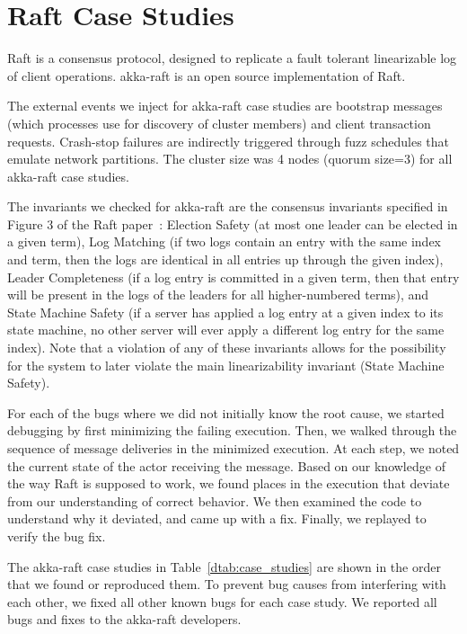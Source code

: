 \section{Raft Case Studies}
\label{app:raft_case_studies}

Raft is a consensus protocol, designed to replicate a fault tolerant linearizable log of
client operations. akka-raft is an open source implementation of Raft.

The external events we inject for akka-raft case studies are
bootstrap messages (which
processes use for discovery of cluster members)
and client transaction requests. Crash-stop failures are indirectly triggered through
fuzz schedules that emulate network partitions.
The cluster size was 4 nodes
(quorum size=3) for all akka-raft case studies.

The invariants we checked for akka-raft are the consensus invariants specified in
Figure 3 of the Raft paper~\cite{ongaro2014search}: Election Safety
(at most one leader can be elected in a
given term), Log Matching (if two logs contain an entry with the same
index and term, then the logs are identical in all entries
up through the given index), Leader Completeness (if a log entry is
committed in a
given term, then that entry will be present in the logs
of the leaders for all higher-numbered terms), and State Machine Safety
(if a server has applied a log entry
at a given index to its state machine, no other server
will ever apply a different log entry for the same index). Note that a
violation of any of these invariants allows for the possibility for the system
to later violate
the main linearizability invariant (State Machine Safety).

For each of the bugs where we did not initially know the root cause, we
started debugging by first minimizing the failing execution. Then,
we walked through the sequence of message deliveries in the
minimized execution. At each step,
we noted the current state of the actor receiving the message. Based on
our knowledge of the way Raft is supposed to work, we found places in
the execution that deviate from our understanding of correct behavior.
We then examined the code to understand why it deviated, and came up
with a fix. Finally, we replayed to verify the bug fix.

The akka-raft case studies in Table~\ref{dtab:case_studies} are shown in the
order that we found or reproduced them. To prevent bug causes from interfering
with
each other, we fixed all other known bugs for each case study. We reported all bugs and fixes to the akka-raft
developers.


